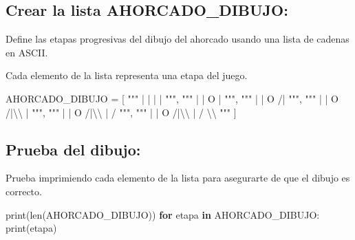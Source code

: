 \documentclass[
  a4paper,
  DIV=11,
  numbers=noendperiod,
  onepage,
  openany]{scrreprt}
\newenvironment{Shaded}{\begin{snugshade}}{\end{snugshade}}
\newcommand{\BuiltInTok}[1]{\textcolor[rgb]{0.00,0.23,0.31}{#1}}
\newcommand{\CharTok}[1]{\textcolor[rgb]{0.13,0.47,0.30}{#1}}
\newcommand{\ControlFlowTok}[1]{\textcolor[rgb]{0.00,0.23,0.31}{\textbf{#1}}}
\newcommand{\KeywordTok}[1]{\textcolor[rgb]{0.00,0.23,0.31}{\textbf{#1}}}
\newcommand{\NormalTok}[1]{\textcolor[rgb]{0.00,0.23,0.31}{#1}}
\newcommand{\OperatorTok}[1]{\textcolor[rgb]{0.37,0.37,0.37}{#1}}
\newcommand{\StringTok}[1]{\textcolor[rgb]{0.13,0.47,0.30}{#1}}
\begin{document}
\subsection{Crear la lista
AHORCADO\_DIBUJO:}\label{crear-la-lista-ahorcado_dibujo}

Define las etapas progresivas del dibujo del ahorcado usando una lista
de cadenas en ASCII.

Cada elemento de la lista representa una etapa del juego.

\begin{Shaded}
\begin{Highlighting}[]
\NormalTok{AHORCADO\_DIBUJO }\OperatorTok{=}\NormalTok{ [}
    \StringTok{"""}
\StringTok{       |}
\StringTok{       |}
\StringTok{       |}
\StringTok{       |}
\StringTok{    """}\NormalTok{,}
    \StringTok{"""}
\StringTok{       |}
\StringTok{       |}
\StringTok{       O}
\StringTok{       |}
\StringTok{    """}\NormalTok{,}
    \StringTok{"""}
\StringTok{       |}
\StringTok{       |}
\StringTok{       O}
\StringTok{      /|}
\StringTok{    """}\NormalTok{,}
    \StringTok{"""}
\StringTok{       |}
\StringTok{       |}
\StringTok{       O}
\StringTok{      /|}\CharTok{\textbackslash{}\textbackslash{}}
\StringTok{       |}
\StringTok{    """}\NormalTok{,}
    \StringTok{"""}
\StringTok{       |}
\StringTok{       |}
\StringTok{       O}
\StringTok{      /|}\CharTok{\textbackslash{}\textbackslash{}}
\StringTok{       |}
\StringTok{      /}
\StringTok{    """}\NormalTok{,}
    \StringTok{"""}
\StringTok{       |}
\StringTok{       |}
\StringTok{       O}
\StringTok{      /|}\CharTok{\textbackslash{}\textbackslash{}}
\StringTok{       |}
\StringTok{      / }\CharTok{\textbackslash{}\textbackslash{}}
\StringTok{    """}
\NormalTok{]}
\end{Highlighting}
\end{Shaded}

\subsection{Prueba del dibujo:}\label{prueba-del-dibujo}

Prueba imprimiendo cada elemento de la lista para asegurarte de que el
dibujo es correcto.

\begin{Shaded}
\begin{Highlighting}[]
\BuiltInTok{print}\NormalTok{(}\BuiltInTok{len}\NormalTok{(AHORCADO\_DIBUJO))}
\ControlFlowTok{for}\NormalTok{ etapa }\KeywordTok{in}\NormalTok{ AHORCADO\_DIBUJO:}
    \BuiltInTok{print}\NormalTok{(etapa)}
\end{Highlighting}
\end{Shaded}
\end{document}

